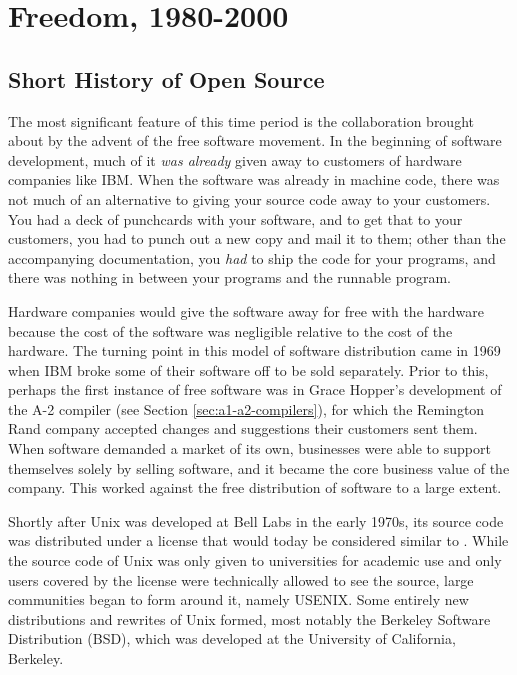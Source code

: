 \chapter{Freedom, 1980-2000}

\section{Short History of Open Source}

The most significant feature of this time period is the collaboration brought about by
the advent of the free software movement.
In the beginning of software development, much of it \textit{was already} given
away to customers of hardware companies like IBM.
When the software was already in machine code, there was not
much of an alternative to giving your source code away to your customers.
You had a deck of punchcards with your software, and to get that to your customers,
you had to punch out a new copy and mail it to them; other than the accompanying documentation,
you \textit{had} to ship the code for your programs, and there was nothing in between your
programs and the runnable program.

Hardware companies would give the software away for free with the hardware because
the cost of the software was negligible relative to the cost of the hardware.
The turning point in this model of software distribution came in 1969 when IBM
broke some of their software off to be sold separately.
Prior to this, perhaps the first instance of free software was in Grace Hopper's development of
the A-2 compiler (see Section \ref{sec:a1-a2-compilers}), for which the Remington Rand company
accepted changes and suggestions their customers sent them.
When software demanded a market of its own, businesses were able to support themselves
solely by selling software, and it became the core business value of the company.
This worked against the free distribution of software to a large extent.

Shortly after Unix was developed at Bell Labs in the early 1970s, its source code
was distributed under a license that would today be considered similar to .
While the source code of Unix was only given to universities for academic use and
only users covered by the license were technically allowed to see the source,
large communities began to form around it, namely USENIX.
Some entirely new distributions and rewrites of Unix formed, most notably the
Berkeley Software Distribution (BSD), which was developed at the University of California,
Berkeley.

